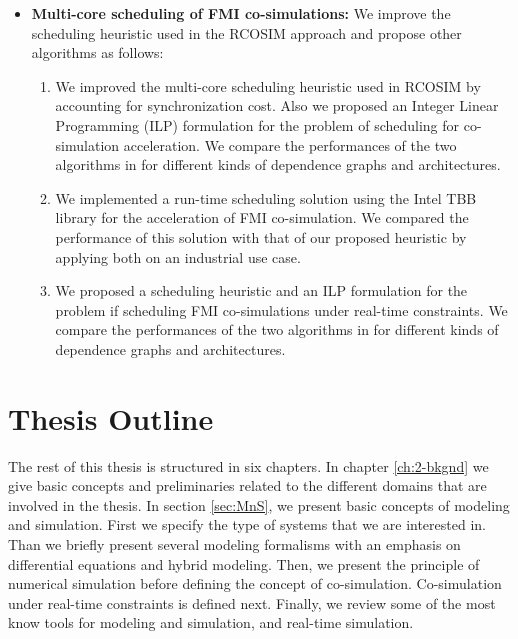 \begin{itemize}
\begin{enumerate}
\setcounter{enumTemp}{\theenumi}

\end{enumerate}

\item \textbf{Multi-core scheduling of FMI co-simulations:} We improve the scheduling heuristic used in the RCOSIM approach and propose other algorithms as follows:

\begin{enumerate}

\setcounter{enumi}{\theenumTemp}

\item We improved the multi-core scheduling heuristic used in RCOSIM by accounting for synchronization cost. Also we proposed an Integer Linear Programming (ILP) formulation for the problem of scheduling for co-simulation acceleration. We compare the performances of the two algorithms in for different kinds of dependence graphs and architectures.

\item We implemented a run-time scheduling solution using the Intel TBB library for the acceleration of FMI co-simulation. We compared the performance of this solution with that of our proposed heuristic by applying both on an industrial use case.

\item We proposed a scheduling heuristic and an ILP formulation for the problem if scheduling FMI co-simulations under real-time constraints. We compare the performances of the two algorithms in for different kinds of dependence graphs and architectures.   

\end{enumerate}

\end{itemize}

\section{Thesis Outline}

The rest of this thesis is structured in six chapters. In chapter \ref{ch:2-bkgnd} we give basic concepts and preliminaries related to the different domains that are involved in the thesis. In section \ref{sec:MnS}, we present basic concepts of modeling and simulation. First we specify the type of systems that we are interested in. Than we briefly present several modeling formalisms with an emphasis on differential equations and hybrid modeling. Then, we present the principle of numerical simulation before defining the concept of co-simulation. Co-simulation under real-time constraints is defined next. Finally, we review some of the most know tools for modeling and simulation, and real-time simulation.

